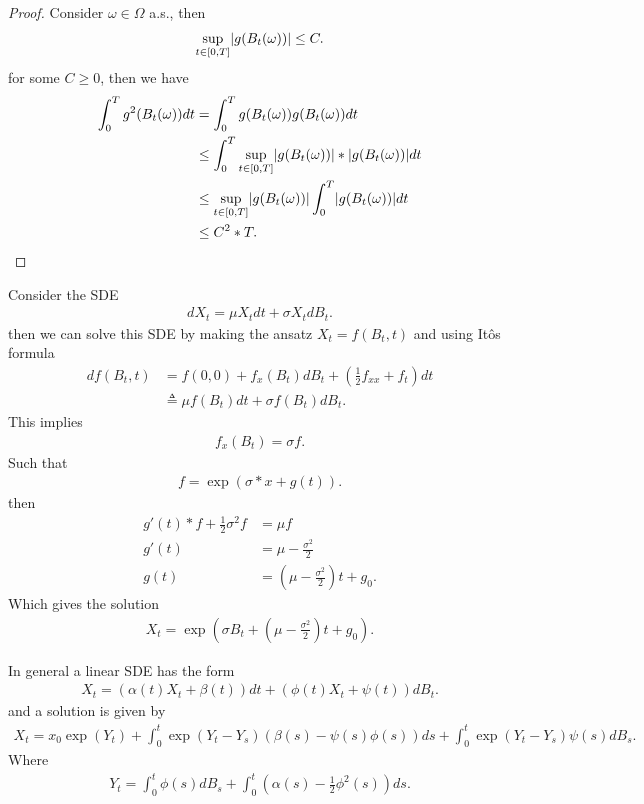 \begin{proof}
 Consider $\omega \in  \Omega $ a.s., then 
 \begin{align*}
   \sup_{t \in  [0,T]}\lvert g(B_t(\omega ))\rvert \le C 
 .\end{align*}
 for some $C\ge 0$, then we have 
\begin{align*}
  \int_0^{T}  g^2(B_t(\omega )) dt &=  \int_0^{T}  g(B_t(\omega ))g(B_t(\omega)) dt\\
                                   &\le \int_0^{T}  \sup_{t \in  [0,T]} \lvert g(B_t(\omega ))\rvert* \lvert g(B_t(\omega))\rvert dt\\
                                   &\le  \sup_{t \in  [0,T]} \lvert g(B_t(\omega ))\rvert\int_0^{T} \lvert g(B_t(\omega))\rvert dt\\
                                   &\le C^2*T 
.\end{align*}
\end{proof}
\begin{example}[5.1]
 Consider the SDE 
 \begin{align*}
  dX_t = \mu X_t dt + \sigma X_t dB_t
 .\end{align*}
 then we can solve this SDE by making the ansatz $X_t = f(B_t,t)$ and using It\^os formula
 \begin{align*}
   df(B_t,t) &= f(0,0) + f_x(B_t)dB_t + (\frac{1}{2}f_{x x}+f_{t}) dt\\
           &\triangleq  \mu  f(B_t) dt + \sigma f(B_t)dB_t
 .\end{align*}
 This implies 
 \begin{align*}
  f_x(B_t) = \sigma  f
 .\end{align*}
 Such that 
 \begin{align*}
  f = \exp(\sigma*x + g(t))
 .\end{align*}
 then 
 \begin{align*}
   g'(t)*f + \frac{1}{2} \sigma^2 f &= \mu  f\\
                                g'(t)   &= \mu  - \frac{\sigma^2}{2}\\
                                g(t)&= (\mu  - \frac{\sigma^2}{2})t + g_{0}
 .\end{align*}
 Which gives the solution 
 \begin{align*}
  X_t = \exp(\sigma B_t + (\mu -\frac{\sigma^2}{2})t + g_{0})
 .\end{align*}
\end{example}
\begin{Definition}
 In general a linear SDE has the form
 \begin{align*}
  X_t = (\alpha (t)X_t + \beta(t) )dt + (\phi(t)X_t + \psi(t))dB_t
 .\end{align*}
 and a solution is given by 
 \begin{align*}
  X_t  = x_{0}\exp(Y_t) + \int_0^{t} \exp(Y_t-Y_s)(\beta(s)-\psi(s)\phi(s))  ds + \int_0^{t}  \exp(Y_t-Y_s)\psi(s)dB_s
 .\end{align*}
 Where
 \begin{align*}
  Y_t = \int_0^{t} \phi(s) dB_s + \int_0^{t}(\alpha(s)-\frac{1}{2}\phi^2(s))   ds
 .\end{align*}
\end{Definition}
